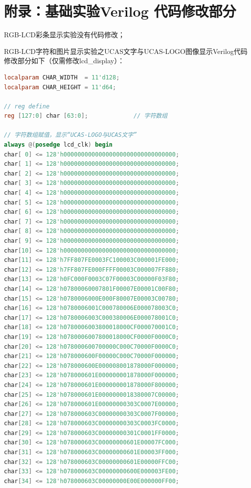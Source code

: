 \documentclass[UTF8]{article}
\theoremstyle{MyLineTheoremStyle} %
\theoremstyle{MyBlockTheoremStyle} %
\theoremstyle{MySubsubsectionStyle} %
\begin{document}
\section{附录：基础实验Verilog 代码修改部分}
RGB-LCD彩条显示实验没有代码修改；\par
RGB-LCD字符和图片显示实验之UCAS文字与UCAS-LOGO图像显示Verilog代码修改部分如下（仅需修改lcd\_display）：
\begin{lstlisting}[language=Verilog, caption={UCAS文字与UCAS-LOGO图像显示Verilog代码修改部分}, label={lst:verilog_code}]
localparam CHAR_WIDTH  = 11'd128;
localparam CHAR_HEIGHT = 11'd64;  

// reg define
reg [127:0] char [63:0];             // 字符数组

// 字符数组赋值，显示“UCAS-LOGO与UCAS文字”
always @(posedge lcd_clk) begin
char[ 0] <= 128'h00000000000000000000000000000000;
char[ 1] <= 128'h00000000000000000000000000000000;
char[ 2] <= 128'h00000000000000000000000000000000;
char[ 3] <= 128'h00000000000000000000000000000000;
char[ 4] <= 128'h00000000000000000000000000000000;
char[ 5] <= 128'h00000000000000000000000000000000;
char[ 6] <= 128'h00000000000000000000000000000000;
char[ 7] <= 128'h00000000000000000000000000000000;
char[ 8] <= 128'h00000000000000000000000000000000;
char[ 9] <= 128'h00000000000000000000000000000000;
char[10] <= 128'h00000000000000000000000000000000;
char[11] <= 128'h7FF807FE0003FC100003C000001FE000;
char[12] <= 128'h7FF807FE000FFFF00003C000007FF880;
char[13] <= 128'h0FC000F0003C07F00003C00000F03F80;
char[14] <= 128'h07800060007801F00007E00001C00F80;
char[15] <= 128'h0780006000E000F80007E00003C00780;
char[16] <= 128'h0780006001C000780006E000078003C0;
char[17] <= 128'h0780006003C000380006E000078001C0;
char[18] <= 128'h0780006003800018000CF000070001C0;
char[19] <= 128'h0780006007800018000CF0000F0000C0;
char[20] <= 128'h078000600700000C000C70000F0000C0;
char[21] <= 128'h078000600F00000C000C70000F000000;
char[22] <= 128'h078000600E000008001878000F000000;
char[23] <= 128'h078000601E000000001878000F000000;
char[24] <= 128'h078000601E000000001878000F800000;
char[25] <= 128'h078000601E0000000018380007C00000;
char[26] <= 128'h078000601E00000000303C0007E00000;
char[27] <= 128'h078000603C00000000303C0007F00000;
char[28] <= 128'h078000603C00000000303C0003FC0000;
char[29] <= 128'h078000603C00000000301C0001FF0000;
char[30] <= 128'h078000603C00000000601E00007FC000;
char[31] <= 128'h078000603C00000000601E00003FF000;
char[32] <= 128'h078000603C00000000601E00000FFC00;
char[33] <= 128'h078000603C00000000600E000003FE00;
char[34] <= 128'h078000603C00000000E00E000000FF00;

\end{lstlisting}
\end{document}
